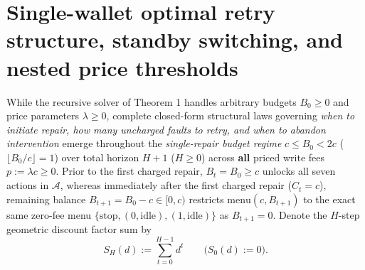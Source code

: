 \documentclass[11pt,a4paper]{article}
\begin{document}
\section{Single-wallet optimal retry structure, standby switching, and
nested price
thresholds}\label{single-wallet-optimal-retry-structure-standby-switching-and-nested-price-thresholds}

While the recursive solver of Theorem 1 handles arbitrary budgets
\(B_0 \ge 0\) and price parameters \(\lambda \ge 0\), complete
closed-form structural laws governing \emph{when to initiate repair, how
many uncharged faults to retry, and when to abandon intervention} emerge
throughout the \emph{single-repair budget regime} \(c \le B_0 < 2c\)
(\(\lfloor B_0/c\rfloor = 1\)) over total horizon \(H + 1\)
(\(H \ge 0\)) across \textbf{all} priced write fees
\(p := \lambda c \ge 0\). Prior to the first charged repair,
\(B_t = B_0 \ge c\) unlocks all seven actions in \(\mathcal{A}\),
whereas immediately after the first charged repair (\(C_t = c\)),
remaining balance \(B_{t+1} = B_0 - c \in [0, c)\) restricts
\(\mathrm{menu}(c, B_{t+1})\) to the exact same zero-fee menu
\(\{\mathrm{stop}, (0, \mathrm{idle}), (1, \mathrm{idle})\}\) as
\(B_{t+1} = 0\). Denote the \(H\)-step geometric discount factor sum by
\[S_H(d) := \sum_{t=0}^{H-1} d^t \qquad \bigl(S_0(d) := 0\bigr).\]
\end{document}
